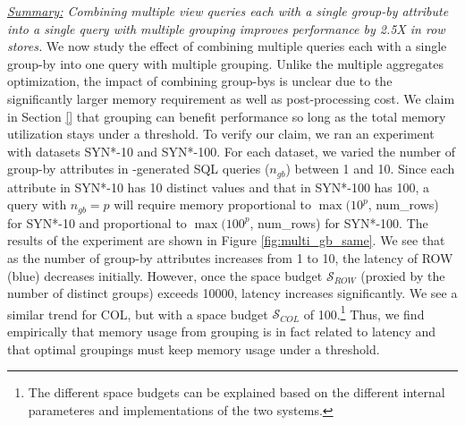 
{\em \underline{Summary:} Combining multiple view queries each with a single group-by attribute into 
a single query with multiple grouping improves performance by 2.5X in row stores.}
We now study the effect of combining multiple queries each with a single group-by into one query
with multiple grouping.
Unlike the multiple aggregates optimization, the impact of combining group-bys
is unclear due to the significantly larger memory requirement as well as post-processing cost.
We claim in Section \ref{} that grouping can benefit performance so long as 
the total memory utilization stays under a threshold.
To verify our claim, we ran an experiment with datasets SYN*-10 and SYN*-100.
For each dataset, we varied the number of group-by attributes in \SeeDB-generated SQL 
queries ($n_{gb}$) between 1 and 10.
Since each attribute in SYN*-10 has 10 distinct values and that in SYN*-100
has 100, a query with $n_{gb}=p$ will require memory proportional to $\max(10^p$,
num\_rows) for SYN*-10 and proportional to $\max(100^p$, num\_rows) for SYN*-100.
The results of the experiment are shown in Figure \ref{fig:multi_gb_same}.
We see that as the number of group-by attributes increases from 1 to 10, 
the latency of ROW (blue) decreases initially.
However, once the space budget $\mathcal{S}_{ROW}$ (proxied by the number of distinct groups) exceeds 10000, 
latency increases significantly.
We see a similar trend for COL, but with a space budget $\mathcal{S}_{COL}$ of 100.\footnote{\scriptsize The different space
budgets can be explained based on the different internal parameteres and implementations of
the two systems.}
Thus, we find empirically that memory usage from grouping is in fact related to latency and that 
optimal groupings must keep memory usage under a threshold.


